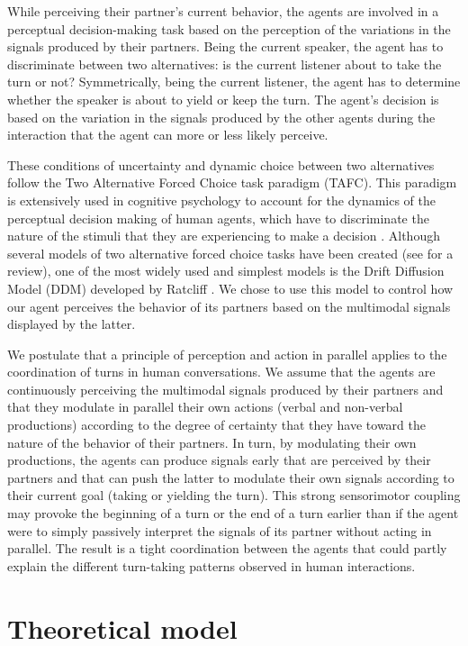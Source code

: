 \documentclass[twocolumn]{svjour3}
\begin{document}
While perceiving their partner's current behavior, the agents are involved in a perceptual decision-making task based on the perception of the variations in the signals produced by their partners. Being the current speaker, the agent has to discriminate between two alternatives: is the current listener about to take the turn or not? Symmetrically, being the current listener, the agent has to determine whether the speaker is about to yield or keep the turn. The agent's decision is based on the variation in the signals produced by the other agents during the interaction that the agent can more or less likely perceive.

These conditions of uncertainty and dynamic choice between two alternatives follow the Two Alternative Forced Choice task paradigm (TAFC). This paradigm is extensively used in cognitive psychology to account for
the dynamics of the perceptual decision making of human agents, which have to discriminate the nature of the
stimuli that they are experiencing to make a decision \citep{bogacz_physics_2006}. Although several models of two alternative forced choice tasks have been created (see \citep{bogacz_physics_2006} for a review), one of the most widely used and simplest models is the Drift Diffusion Model (DDM) developed by Ratcliff \citep{ratcliff_theory_1978}. 
We chose to use this model to control how our agent perceives the behavior of its partners based on the multimodal signals displayed by the latter. 

 We postulate that a principle of perception and action in parallel applies to the coordination
of turns in human conversations. We assume that the agents are continuously perceiving the multimodal signals
produced by their partners and that they modulate in parallel their own actions (verbal and non-verbal
productions) according to the degree of certainty that they have toward the nature of the behavior of their partners.
In turn, by modulating their own productions, the agents can  produce signals early that are perceived by
their partners and that can push the latter to modulate their own signals according to their current goal
(taking or yielding the turn). This strong sensorimotor coupling may provoke the beginning of a turn or the end
of a turn earlier than if the agent were to simply passively interpret the signals of its partner without acting in parallel. 
The result is a tight coordination between the agents that could partly explain the different turn-taking patterns observed in human interactions. 

\section{Theoretical model}
\label{mod_pres}
\end{document}
